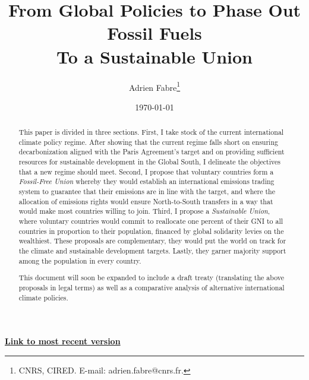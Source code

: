 \documentclass[12pt,english]{article}
\title{From Global Policies to Phase Out Fossil Fuels\\To a Sustainable Union}
\author{Adrien Fabre\footnote{CNRS, CIRED. E-mail: adrien.fabre@cnrs.fr.}}
\date{\today} %
\makeatletter
\renewcommand\tableofcontents{%
    \@starttoc{toc}%
}
\newcommand{\bo}[1]{\textbf{#1}}
\makeatother
\begin{document}
\sloppy
\maketitle

\begin{center}
{\bo{\href{https://github.com/bixiou/global_tax_attitudes/raw/main/paper/global_climate_policies.pdf}{Link to most recent version}}}
\end{center}


\begin{abstract}

This paper is divided in three sections. First, I take stock of the current international climate policy regime. After showing that the current regime falls short on ensuring decarbonization aligned with the Paris Agreement's target and on providing sufficient resources for sustainable development in the Global South, I delineate the objectives that a new regime should meet. Second, I propose that voluntary countries form a \textit{Fossil-Free Union} whereby they would establish an international emissions trading system to guarantee that their emissions are in line with the target, and where the allocation of emissions rights would ensure North-to-South transfers in a way that would make most countries willing to join. Third, I propose a \textit{Sustainable Union}, where voluntary countries would commit to reallocate one percent of their GNI to all countries in proportion to their population, financed by global solidarity levies on the wealthiest. These proposals are complementary, they would put the world on track for the climate and sustainable development targets. Lastly, they garner majority support among the population in every country. 

This document will soon be expanded to include a draft treaty (translating the above proposals in legal terms) as well as a comparative analysis of alternative international climate policies.

\end{abstract}

\clearpage
\tableofcontents

\end{document}
